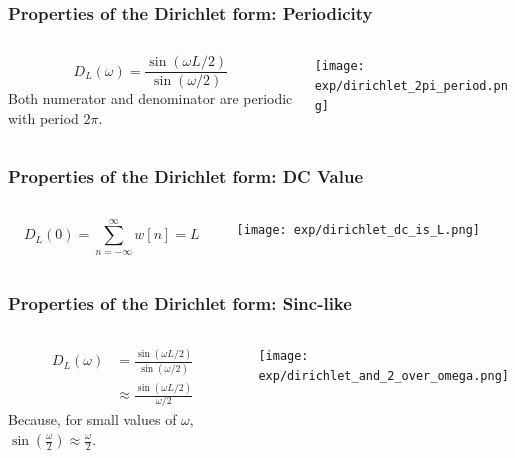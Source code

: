 \documentclass{beamer}
\begin{document}
\begin{frame}
  \frametitle{Properties of the Dirichlet form: Periodicity}

  \begin{columns}
    \begin{column}{0.5\textwidth}

      \begin{displaymath}
        D_L(\omega) = \frac{\sin(\omega L/2)}{\sin(\omega/2)}
      \end{displaymath}
      Both numerator and denominator are periodic with period $2\pi$.
    \end{column}
    \begin{column}{0.5\textwidth}
      \centerline{\texttt{[image: exp/dirichlet\_2pi\_period.png]}}
    \end{column}
  \end{columns}
\end{frame}

\begin{frame}
  \frametitle{Properties of the Dirichlet form: DC Value}

  \begin{columns}
    \begin{column}{0.5\textwidth}

      \begin{displaymath}      
        D_L(0) = \sum_{n=-\infty}^\infty w[n] = L
      \end{displaymath}
      
    \end{column}
    \begin{column}{0.5\textwidth}
      \centerline{\texttt{[image: exp/dirichlet\_dc\_is\_L.png]}}
    \end{column}
  \end{columns}
\end{frame}

\begin{frame}
  \frametitle{Properties of the Dirichlet form: Sinc-like}

  \begin{columns}
    \begin{column}{0.5\textwidth}

      \begin{align*}      
        D_L(\omega) &= \frac{\sin(\omega L/2)}{\sin(\omega/2)}\\
        &\approx \frac{\sin(\omega L/2)}{\omega/2}
      \end{align*}
      Because, for small values of $\omega$,
      $\sin\left(\frac{\omega}{2}\right)\approx\frac{\omega}{2}$.

    \end{column}
    \begin{column}{0.5\textwidth}
      \centerline{\texttt{[image: exp/dirichlet\_and\_2\_over\_omega.png]}}
    \end{column}
  \end{columns}
\end{frame}
\end{document}
